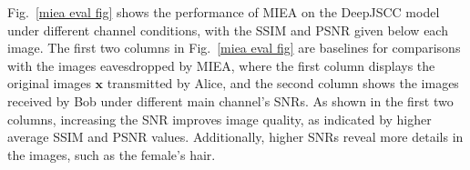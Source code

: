 \documentclass[conference]{IEEEtran}
\begin{document}

    

Fig.~\ref{miea eval fig} shows the performance of MIEA on the DeepJSCC model under different channel conditions, with the SSIM and PSNR given below each image. The first two columns in Fig.~\ref{miea eval fig} are baselines for comparisons with the images eavesdropped by MIEA, where the first column displays the original images $\boldsymbol{x}$ transmitted by Alice, and the second column shows the images received by Bob under different main channel's SNRs. As shown in the first two columns, increasing the SNR improves image quality, as indicated by higher average SSIM and PSNR values. Additionally, higher SNRs reveal more details in the images, such as the female's hair.
\end{document}
